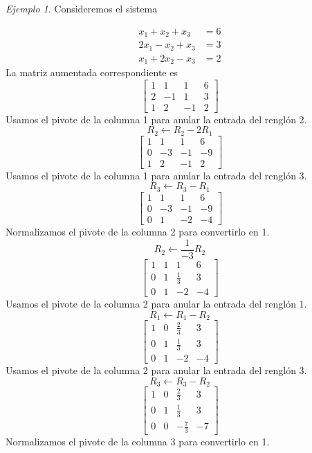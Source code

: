 \documentclass[12pt]{article}
\theoremstyle{remark}
\newtheorem{Ejem}[definicion]{Ejemplo}
\begin{document}
\begin{Ejem}
Consideremos el sistema

\[
\begin{aligned}
x_{1} + x_{2} + x_{3} &= 6\\
2 x_{1} - x_{2} + x_{3} &= 3\\
x_{1} + 2 x_{2} - x_{3} &= 2
\end{aligned}
\]
La matriz aumentada correspondiente es
\[
\left[\begin{array}{ccc|c}
1 & 1 & 1 & 6\\
2 & -1 & 1 & 3\\
1 & 2 & -1 & 2
\end{array}\right]
\]
Usamos el pivote de la columna 1 para anular la entrada del renglón 2.
\[
R_{2}\leftarrow R_{2}-2R_{1}
\]
\[
\left[\begin{array}{ccc|c}
1 & 1 & 1 & 6\\
0 & -3 & -1 & -9\\
1 & 2 & -1 & 2
\end{array}\right]
\]
 Usamos el pivote de la columna 1 para anular la entrada del renglón 3.
\[
R_{3}\leftarrow R_{3}-R_{1}
\]
\[
\left[\begin{array}{ccc|c}
1 & 1 & 1 & 6\\
0 & -3 & -1 & -9\\
0 & 1 & -2 & -4
\end{array}\right]
\]
 Normalizamos el pivote de la columna 2 para convertirlo en 1.
\[
R_{2}\leftarrow \frac{1}{-3}R_{2}
\]
\[
\left[\begin{array}{ccc|c}
1 & 1 & 1 & 6\\
0 & 1 & \frac{1}{3} & 3\\
0 & 1 & -2 & -4
\end{array}\right]
\]
 Usamos el pivote de la columna 2 para anular la entrada del renglón 1.
\[
R_{1}\leftarrow R_{1}-R_{2}
\]
\[
\left[\begin{array}{ccc|c}
1 & 0 & \frac{2}{3} & 3\\
0 & 1 & \frac{1}{3} & 3\\
0 & 1 & -2 & -4
\end{array}\right]
\]
 Usamos el pivote de la columna 2 para anular la entrada del renglón 3.
\[
R_{3}\leftarrow R_{3}-R_{2}
\]
\[
\left[\begin{array}{ccc|c}
1 & 0 & \frac{2}{3} & 3\\
0 & 1 & \frac{1}{3} & 3\\
0 & 0 & - \frac{7}{3} & -7
\end{array}\right]
\]
Normalizamos el pivote de la columna 3 para convertirlo en 1.

\end{Ejem}
\end{document}
